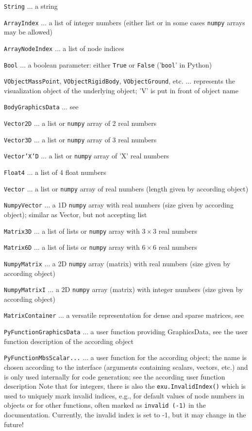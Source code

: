   \item \texttt{String} $\ldots$ a string
  \item \texttt{ArrayIndex} $\ldots$ a list of integer numbers (either list or in some cases \texttt{numpy} arrays may be allowed)
  \item \texttt{ArrayNodeIndex} $\ldots$ a list of node indices
  \item \texttt{Bool} $\ldots$ a boolean parameter: either \texttt{True} or \texttt{False} ('\texttt{bool}' in Python)
  \item \texttt{VObjectMassPoint}, \texttt{VObjectRigidBody}, \texttt{VObjectGround}, etc.  $\ldots$ represents the visualization object of the underlying object; 'V' is put in front of object name
  \item \texttt{BodyGraphicsData} $\ldots$ see 
%
  \item \texttt{Vector2D} $\ldots$ a list or \texttt{numpy} array of 2 real numbers
  \item \texttt{Vector3D} $\ldots$ a list or \texttt{numpy} array of 3 real numbers
  \item \texttt{Vector'X'D} $\ldots$ a list or \texttt{numpy} array of 'X' real numbers
  \item \texttt{Float4} $\ldots$ a list of 4 float numbers
  \item \texttt{Vector} $\ldots$ a list or \texttt{numpy} array of real numbers (length given by according object)
  \item \texttt{NumpyVector} $\ldots$ a 1D \texttt{numpy} array with real numbers (size given by according object); similar as Vector, but not accepting list
%
  \item \texttt{Matrix3D} $\ldots$ a list of lists or \texttt{numpy} array with $3 \times 3$ real numbers
  \item \texttt{Matrix6D} $\ldots$ a list of lists or \texttt{numpy} array with $6 \times 6$ real numbers
  \item \texttt{NumpyMatrix} $\ldots$ a 2D \texttt{numpy} array (matrix) with real numbers (size given by according object)
  \item \texttt{NumpyMatrixI} $\ldots$ a 2D \texttt{numpy} array (matrix) with integer numbers (size given by according object)
  \item \texttt{MatrixContainer} $\ldots$ a versatile representation for dense and sparse matrices, see 
%
  \item \texttt{PyFunctionGraphicsData} $\ldots$ a user function providing GraphicsData, see the user function description of the according object
  \item \texttt{PyFunctionMbsScalar...} $\ldots$ a user function for the according object; the name is chosen according to the interface (arguments containing scalars, vectors, etc.) and is only used internally for code generation; see the according user function description
\ei
Note that for integers, there is also the \texttt{exu.InvalidIndex()} which is used to uniquely mark invalid indices, e.g., for default values of node numbers in objects or for other functions, often marked as \texttt{invalid (-1)} in the documentation. Currently, the invalid index is set to -1, but it may change in the future!

